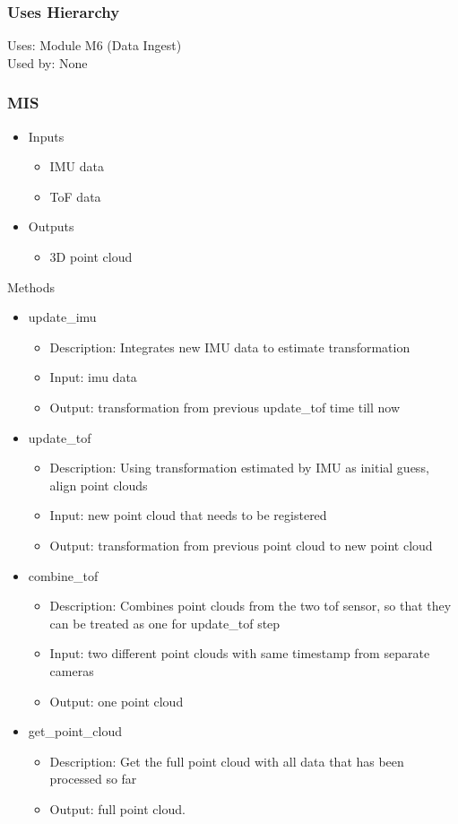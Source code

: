 \documentclass[11pt]{article}
\begin{document}
			\subsubsection{Uses Hierarchy}
				Uses: Module M6 (Data Ingest)\\
				Used by: None 
			\subsubsection{MIS}    
			\begin{itemize}
		\item Inputs 
			\begin{itemize}
		\item IMU data 
		\item ToF data 
			\end{itemize}
		\item Outputs 
			\begin{itemize}
		\item 3D point cloud 
			\end{itemize}
			\end{itemize}

Methods 
\begin{itemize}
\item update\_imu 
	\begin{itemize}
		\item Description: Integrates new IMU data to estimate transformation 
		\item Input: imu data 
		\item Output: transformation from previous update\_tof time till now 
	\end{itemize}
\item update\_tof
	\begin{itemize}
\item Description: Using transformation estimated by IMU as initial guess, align point clouds 
\item Input: new point cloud that needs to be registered 
\item Output: transformation from previous point cloud to new point cloud 
	\end{itemize}
\item combine\_tof 
	\begin{itemize}
\item Description: Combines point clouds from the two tof sensor, so that they can be treated as one for update\_tof step 
\item Input: two different point clouds with same timestamp from separate cameras 
\item Output: one point cloud 
	\end{itemize}
\item get\_point\_cloud 
	\begin{itemize}
\item Description: Get the full point cloud with all data that has been processed so far 
\item Output: full point cloud. 
	\end{itemize}
\end{itemize}
\end{document}
